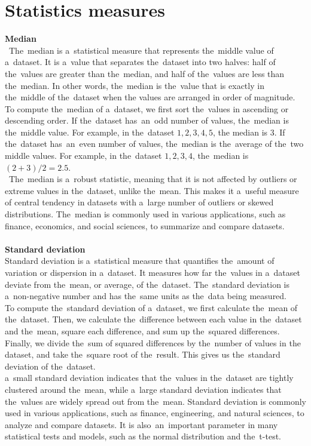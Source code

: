     \section{Statistics measures} \label{subsec:statistics}
    \textbf{Median}\\
   ~The~median is a~statistical measure that represents the~middle value of a~dataset. It is a~value that separates
    the~dataset into two halves: half of the~values are greater than the~median, and half of the~values are less than
    the~median. In other words, the~median is the~value that is exactly in the~middle of the~dataset when the
    values are arranged in order of magnitude.
    \\
    To compute the~median of a~dataset, we first sort the~values in ascending or descending order. If the~dataset
    has~an~odd number of values, the~median is the~middle value. For example, in the~dataset ${1, 2, 3, 4, 5}$, the
    median is $3$. If the~dataset has~an~even number of values, the~median is the~average of the~two middle values.
    For example, in the~dataset ${1, 2, 3, 4}$, the~median is $(2 + 3) / 2 = 2.5$.
    \\
   ~The~median is a~robust statistic, meaning that it is not affected by outliers or extreme values in the~dataset,
    unlike the~mean. This makes it a~useful measure of central tendency in datasets with a~large number of outliers or
    skewed distributions. The~median is commonly used in various applications, such as finance, economics, and social
    sciences, to summarize and compare datasets.\\
    \\
    \textbf{Standard deviation}\\
    Standard deviation is a~statistical measure that quantifies the~amount of variation or dispersion in a~dataset.
    It measures how far the~values in a~dataset deviate from the~mean, or average, of the~dataset. The~standard
    deviation is a~non-negative number and has the~same units as the~data being measured.
    \\
    To compute the~standard deviation of a~dataset, we first calculate the~mean of the~dataset.
    Then, we calculate the~difference between each value in the~dataset and the~mean, square each difference, and
    sum up the~squared differences. Finally, we divide the~sum of squared differences by the~number of values in the
    dataset, and take the~square root of the~result. This gives us the~standard deviation of the~dataset.
    \\
    a~small standard deviation indicates that the~values in the~dataset are tightly clustered around the~mean,
    while a~large standard deviation indicates that the~values are widely spread out from the~mean. Standard
    deviation is commonly used in various applications, such as finance, engineering, and natural sciences, to
    analyze and compare datasets. It is also~an~important parameter in many statistical tests and models, such as the
    normal distribution and the~t-test.

